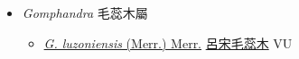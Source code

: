
  \begin{itemize}
 \item[] \textit{Gomphandra} 毛蕊木屬
                    
  \begin{itemize}
        \item[] \href{http://www.theplantlist.org/tpl1.1/search?q=Gomphandra+luzoniensis}{\textit{G. luzoniensis} (Merr.) Merr.}   \href{\detokenize{http://taibnet.sinica.edu.tw/chi/taibnet_species_list.php?T2=呂宋毛蕊木&T2_new_value=true&fr=y}}{呂宋毛蕊木} VU
  \end{itemize}
  \end{itemize}
